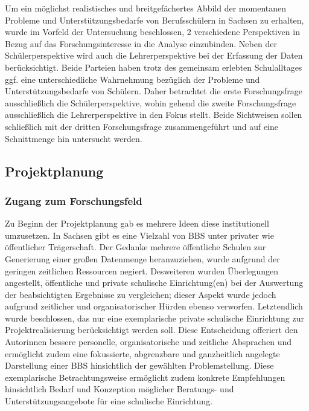 Um ein möglichst realistisches und breitgefächertes Abbild der momentanen Probleme und Unterstützungsbedarfe von Berufsschülern in Sachsen zu erhalten, wurde im Vorfeld der Untersuchung beschlossen, 2 verschiedene Perspektiven in Bezug auf das Forschungsinteresse in die Analyse einzubinden. Neben der Schülerperspektive wird auch die Lehrerperspektive bei der Erfassung der Daten berücksichtigt. Beide Parteien haben trotz des gemeinsam erlebten Schulalltages ggf. eine unterschiedliche Wahrnehmung bezüglich der Probleme und Unterstützungsbedarfe von Schülern. Daher betrachtet die erste Forschungsfrage ausschließlich die Schülerperspektive, wohin gehend die zweite Forschungsfrage ausschließlich die Lehrerperspektive in den Fokus stellt. Beide Sichtweisen sollen schließlich mit der dritten Forschungsfrage zusammengeführt und auf eine Schnittmenge hin untersucht werden.

\subsection{Projektplanung}
\label{sec:Projektplanung}

\subsubsection{Zugang zum Forschungsfeld}
\label{sec:ZugangZumForschungsfeld}

Zu Beginn der Projektplanung gab es mehrere Ideen diese institutionell umzusetzen. In Sachsen gibt es eine Vielzahl von BBS unter privater wie öffentlicher Trägerschaft. Der Gedanke mehrere öffentliche Schulen zur Generierung einer großen Datenmenge heranzuziehen, wurde aufgrund der geringen zeitlichen Ressourcen negiert. Desweiteren wurden Überlegungen angestellt, öffentliche und private schulische Einrichtung(en) bei der Auswertung der beabsichtigten Ergebnisse zu vergleichen; dieser Aspekt wurde jedoch aufgrund zeitlicher und organisatorischer Hürden ebenso verworfen. Letztendlich wurde beschlossen, das nur eine exemplarische private schulische Einrichtung zur Projektrealisierung berücksichtigt werden soll. Diese Entscheidung offeriert den Autorinnen bessere personelle, organisatorische und zeitliche Absprachen und ermöglicht zudem eine fokussierte, abgrenzbare und ganzheitlich angelegte Darstellung einer BBS hinsichtlich der gewählten Problemstellung. Diese exemplarische  Betrachtungsweise ermöglicht zudem konkrete Empfehlungen hinsichtlich Bedarf und Konzeption möglicher Beratungs- und Unterstützungsangebote für eine schulische Einrichtung.

